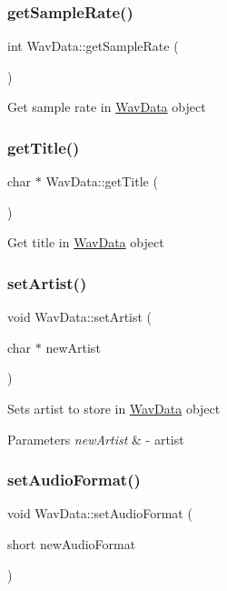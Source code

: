 \subsubsection{\texorpdfstring{get\+Sample\+Rate()}{getSampleRate()}}
{\footnotesize\ttfamily int Wav\+Data\+::get\+Sample\+Rate (\begin{DoxyParamCaption}{ }\end{DoxyParamCaption})}

Get sample rate in \hyperlink{classWavData}{Wav\+Data} object \mbox{\label{classWavData_af721e19f059afd5fa617c2cfce3d6526}} 
\subsubsection{\texorpdfstring{get\+Title()}{getTitle()}}
{\footnotesize\ttfamily char $\ast$ Wav\+Data\+::get\+Title (\begin{DoxyParamCaption}{ }\end{DoxyParamCaption})}

Get title in \hyperlink{classWavData}{Wav\+Data} object \mbox{\label{classWavData_aff3a19bb77f284e887a2c61345eed29b}} 
\subsubsection{\texorpdfstring{set\+Artist()}{setArtist()}}
{\footnotesize\ttfamily void Wav\+Data\+::set\+Artist (\begin{DoxyParamCaption}\item[{char $\ast$}]{new\+Artist }\end{DoxyParamCaption})}

Sets artist to store in \hyperlink{classWavData}{Wav\+Data} object 
\begin{DoxyParams}{Parameters}
{\em new\+Artist} & -\/ artist \\
\hline
\end{DoxyParams}
\mbox{\label{classWavData_a5574d225ec508750bdf2dc72791ab328}} 
\subsubsection{\texorpdfstring{set\+Audio\+Format()}{setAudioFormat()}}
{\footnotesize\ttfamily void Wav\+Data\+::set\+Audio\+Format (\begin{DoxyParamCaption}\item[{short}]{new\+Audio\+Format }\end{DoxyParamCaption})}

